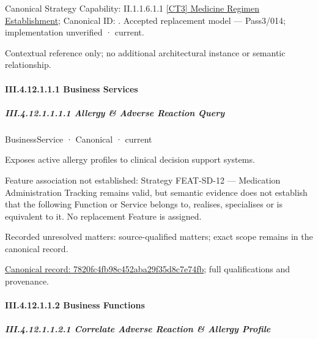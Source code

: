 {\small Canonical Strategy Capability: II.1.1.6.1.1 \hyperref[element:d0510b19ab734149b0f5f8b0ef16d40e]{[CT3] Medicine Regimen Establishment}; Canonical ID: \texttt{}. Accepted replacement model — Pass3/014; implementation unverified · current.}\par
Contextual reference only; no additional architectural instance or semantic relationship.\par
\paragraph*{III.4.12.1.1.1 Business Services}
\label{navigation:III.4.12.1.1.1}

\subparagraph*{III.4.12.1.1.1.1 Allergy \& Adverse Reaction Query}
\label{navigation:III.4.12.1.1.1.1}

\label{element:7820fc4fb98c452aba29f35d8c7e74fb}
{\small BusinessService · Canonical · current}\par

Exposes active allergy profiles to clinical decision support systems.



Feature association not established: Strategy FEAT-SD-12 — Medication Administration Tracking remains valid, but semantic evidence does not establish that the following Function or Service belongs to, realises, specialises or is equivalent to it. No replacement Feature is assigned.


{\small Recorded unresolved matters: source-qualified matters; exact scope remains in the canonical record.}\par
{\footnotesize \href{../../../../../../../../continuum/business/business-service/7820fc4fb98c452aba29f35d8c7e74fb.md}{Canonical record: 7820fc4fb98c452aba29f35d8c7e74fb}; full qualifications and provenance.}\par
\paragraph*{III.4.12.1.1.2 Business Functions}
\label{navigation:III.4.12.1.1.2}

\subparagraph*{III.4.12.1.1.2.1 Correlate Adverse Reaction \& Allergy Profile}
\label{navigation:III.4.12.1.1.2.1}

